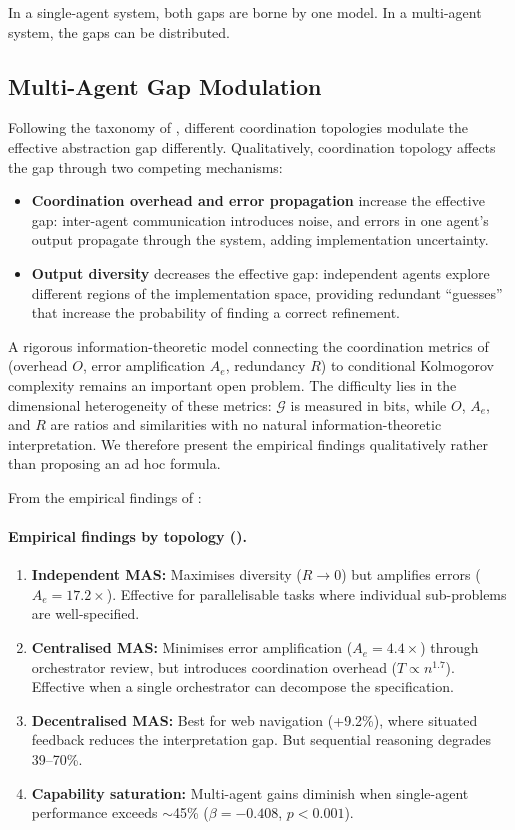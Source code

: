 \documentclass[11pt, a4paper, logo, copyright]{googledeepmind}
\begin{document}
In a single-agent system, both gaps are borne by one model. In a multi-agent system, the gaps can be distributed.

\subsection{Multi-Agent Gap Modulation}

Following the taxonomy of \citet{kim2025scaling}, different coordination topologies modulate the effective abstraction gap differently. Qualitatively, coordination topology affects the gap through two competing mechanisms:

\begin{itemize}
    \item \textbf{Coordination overhead and error propagation} increase the effective gap: inter-agent communication introduces noise, and errors in one agent's output propagate through the system, adding implementation uncertainty.
    \item \textbf{Output diversity} decreases the effective gap: independent agents explore different regions of the implementation space, providing redundant ``guesses'' that increase the probability of finding a correct refinement.
\end{itemize}

A rigorous information-theoretic model connecting the coordination metrics of \citet{kim2025scaling} (overhead $O$, error amplification $A_e$, redundancy $R$) to conditional Kolmogorov complexity remains an important open problem. The difficulty lies in the dimensional heterogeneity of these metrics: $\mathcal{G}$ is measured in bits, while $O$, $A_e$, and $R$ are ratios and similarities with no natural information-theoretic interpretation. We therefore present the empirical findings qualitatively rather than proposing an ad hoc formula.

From the empirical findings of \citet{kim2025scaling}:

\paragraph{Empirical findings by topology (\citealp{kim2025scaling}).}
\label{prop:topology}
\begin{enumerate}
    \item \textbf{Independent MAS:} Maximises diversity ($R \to 0$) but amplifies errors ($A_e = 17.2\times$). Effective for parallelisable tasks where individual sub-problems are well-specified.
    \item \textbf{Centralised MAS:} Minimises error amplification ($A_e = 4.4\times$) through orchestrator review, but introduces coordination overhead ($T \propto n^{1.7}$). Effective when a single orchestrator can decompose the specification.
    \item \textbf{Decentralised MAS:} Best for web navigation (+9.2\%), where situated feedback reduces the interpretation gap. But sequential reasoning degrades 39--70\%.
    \item \textbf{Capability saturation:} Multi-agent gains diminish when single-agent performance exceeds $\sim$45\% ($\beta = -0.408$, $p < 0.001$).
\end{enumerate}
\end{document}

